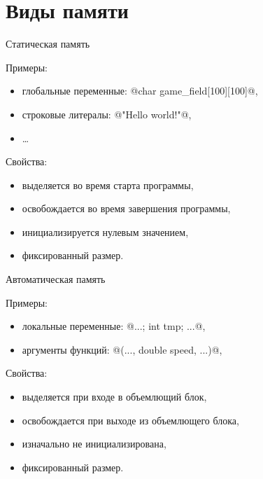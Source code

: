 \section{Виды памяти}

\begin{frame}[fragile]{Статическая память}

  Примеры:
  \begin{itemize}
    \item глобальные переменные: @char game_field[100][100]@,
    \item строковые литералы: @"Hello world!"@,
    \item \ldots
  \end{itemize}

  \pause
  Свойства:
  \begin{itemize}
    \item выделяется во время старта программы,
    \item освобождается во время завершения программы,
    \item инициализируется нулевым значением,
    \item фиксированный размер.
  \end{itemize}

\end{frame}

\begin{frame}[fragile]{Автоматическая память}

  Примеры:
  \begin{itemize}
    \item локальные переменные: @{...; int tmp; ...}@,
    \item аргументы функций: @(..., double speed, ...)@,
  \end{itemize}

  \pause
  Свойства:
  \begin{itemize}
    \item выделяется при входе в объемлющий блок,
    \item освобождается при выходе из объемлющего блока,
    \item изначально не инициализирована,
    \item фиксированный размер.
  \end{itemize}

\end{frame}

